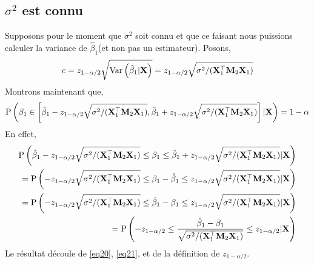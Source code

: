 \subsection{$\sigma^2$ est connu}
Supposons pour le moment que $\sigma^2$ soit connu et que ce faisant nous puissions calculer la variance de $\hat{\beta}_1$(et non pas un estimateur). Posons,
\begin{align*}
c = z_{1-\alpha/2}\sqrt{\operatorname{Var}\left(\hat{\beta} _1| \mathbf X \right)}=z_{1-\alpha/2}\sqrt{\sigma^2/(\mathbf X_1^\top\mathbf M_2\mathbf X_1)}
\end{align*}
Montrons maintenant que,
\begin{align*}
\operatorname{P}\left(
\beta_1 \in \left[\hat{\beta}_1 -z_{1-\alpha/2}\sqrt{\sigma^2/(\mathbf X_1^\top\mathbf M_2\mathbf X_1)} , \hat{\beta}_1+
z_{1-\alpha/2}\sqrt{\sigma^2/(\mathbf X_1^\top\mathbf M_2\mathbf X_1)} \right] | \mathbf X\right) = 1-\alpha
\end{align*}
En effet,
\begin{align}
\operatorname{P}\left(
\hat{\beta}_1 -z_{1-\alpha/2}\sqrt{\sigma^2/(\mathbf X_1^\top\mathbf M_2\mathbf X_1)}
\leq \beta_1 \leq
\hat{\beta}_1+
z_{1-\alpha/2}\sqrt{\sigma^2/(\mathbf X_1^\top\mathbf M_2\mathbf X_1)}  | \mathbf X
\right) \nonumber\\
=\operatorname{P}\left(
-z_{1-\alpha/2}\sqrt{\sigma^2/(\mathbf X_1^\top\mathbf M_2\mathbf X_1)}
\leq \beta_1 - \hat{\beta}_1 \leq
z_{1-\alpha/2}\sqrt{\sigma^2/(\mathbf X_1^\top\mathbf M_2\mathbf X_1)}  | \mathbf X
\right)\nonumber\\
=\operatorname{P}\left(
-z_{1-\alpha/2}\sqrt{\sigma^2/(\mathbf X_1^\top\mathbf M_2\mathbf X_1)}
\leq  \hat{\beta}_1-\beta_1 \leq
z_{1-\alpha/2}\sqrt{\sigma^2/(\mathbf X_1^\top\mathbf M_2\mathbf X_1)}  | \mathbf X
\right)\nonumber\\
=
\operatorname{P}\left(
-z_{1-\alpha/2}
\leq  \frac{\hat{\beta}_1-\beta_1}{\sqrt{\sigma^2/(\mathbf X_1^\top\mathbf M_2\mathbf X_1)}} \leq
z_{1-\alpha/2}  | \mathbf X
\right)
\label{eq21}
\end{align}
Le résultat découle de \eqref{eq20}, \eqref{eq21}, et de la définition de $z_{1-\alpha/2}$.

